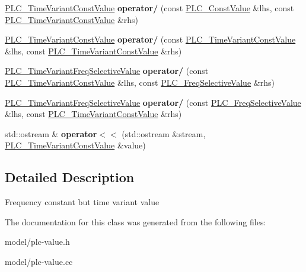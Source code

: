 \begin{DoxyCompactItemize}
\item 
\hypertarget{classns3_1_1PLC__TimeVariantConstValue_a796c19b079e27ca80c66865f764df093}{\hyperlink{classns3_1_1PLC__TimeVariantConstValue}{\-P\-L\-C\-\_\-\-Time\-Variant\-Const\-Value} {\bfseries operator/} (const \hyperlink{classns3_1_1PLC__ConstValue}{\-P\-L\-C\-\_\-\-Const\-Value} \&lhs, const \hyperlink{classns3_1_1PLC__TimeVariantConstValue}{\-P\-L\-C\-\_\-\-Time\-Variant\-Const\-Value} \&rhs)}\label{classns3_1_1PLC__TimeVariantConstValue_a796c19b079e27ca80c66865f764df093}

\item 
\hypertarget{classns3_1_1PLC__TimeVariantConstValue_ab98ac2f9f37bf74d76f01bb2990e89ac}{\hyperlink{classns3_1_1PLC__TimeVariantConstValue}{\-P\-L\-C\-\_\-\-Time\-Variant\-Const\-Value} {\bfseries operator/} (const \hyperlink{classns3_1_1PLC__TimeVariantConstValue}{\-P\-L\-C\-\_\-\-Time\-Variant\-Const\-Value} \&lhs, const \hyperlink{classns3_1_1PLC__TimeVariantConstValue}{\-P\-L\-C\-\_\-\-Time\-Variant\-Const\-Value} \&rhs)}\label{classns3_1_1PLC__TimeVariantConstValue_ab98ac2f9f37bf74d76f01bb2990e89ac}

\item 
\hypertarget{classns3_1_1PLC__TimeVariantConstValue_a0655c0e755a478cc0b4f5a1c23c9efd9}{\hyperlink{classns3_1_1PLC__TimeVariantFreqSelectiveValue}{\-P\-L\-C\-\_\-\-Time\-Variant\-Freq\-Selective\-Value} {\bfseries operator/} (const \hyperlink{classns3_1_1PLC__TimeVariantConstValue}{\-P\-L\-C\-\_\-\-Time\-Variant\-Const\-Value} \&lhs, const \hyperlink{classns3_1_1PLC__FreqSelectiveValue}{\-P\-L\-C\-\_\-\-Freq\-Selective\-Value} \&rhs)}\label{classns3_1_1PLC__TimeVariantConstValue_a0655c0e755a478cc0b4f5a1c23c9efd9}

\item 
\hypertarget{classns3_1_1PLC__TimeVariantConstValue_ac83aa895ecbeab5a39607bac5dfdd80a}{\hyperlink{classns3_1_1PLC__TimeVariantFreqSelectiveValue}{\-P\-L\-C\-\_\-\-Time\-Variant\-Freq\-Selective\-Value} {\bfseries operator/} (const \hyperlink{classns3_1_1PLC__FreqSelectiveValue}{\-P\-L\-C\-\_\-\-Freq\-Selective\-Value} \&lhs, const \hyperlink{classns3_1_1PLC__TimeVariantConstValue}{\-P\-L\-C\-\_\-\-Time\-Variant\-Const\-Value} \&rhs)}\label{classns3_1_1PLC__TimeVariantConstValue_ac83aa895ecbeab5a39607bac5dfdd80a}

\item 
\hypertarget{classns3_1_1PLC__TimeVariantConstValue_a83a77d3b9900f68fb908ada656e48283}{std\-::ostream \& {\bfseries operator$<$$<$} (std\-::ostream \&stream, \hyperlink{classns3_1_1PLC__TimeVariantConstValue}{\-P\-L\-C\-\_\-\-Time\-Variant\-Const\-Value} \&value)}\label{classns3_1_1PLC__TimeVariantConstValue_a83a77d3b9900f68fb908ada656e48283}

\end{DoxyCompactItemize}


\subsection{\-Detailed \-Description}
\-Frequency constant but time variant value 

\-The documentation for this class was generated from the following files\-:\begin{DoxyCompactItemize}
\item 
model/plc-\/value.\-h\item 
model/plc-\/value.\-cc\end{DoxyCompactItemize}
